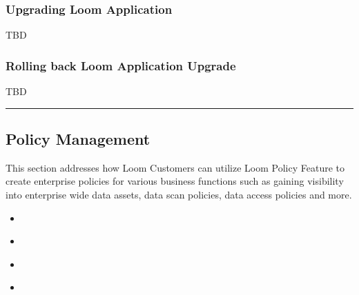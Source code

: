 \documentclass[letterpaper,10pt,english]{sphinxmanual}
\begin{document}
\subsubsection{Upgrading Loom Application}
\label{\detokenize{loom_getting_started_guide:upgrading-loom-application}}
TBD


\subsubsection{Rolling back Loom Application Upgrade}
\label{\detokenize{loom_getting_started_guide:rolling-back-loom-application-upgrade}}
TBD


\bigskip\hrule\bigskip



\subsection{Policy Management}
\label{\detokenize{loom_getting_started_guide:policy-management}}
This section addresses how Loom Customers can utilize Loom Policy Feature to create enterprise policies for various business functions such as gaining visibility into enterprise wide data assets, data scan policies, data access policies and more.

\begin{sphinxShadowBox}
\begin{itemize}
\item {} 
\label{\detokenize{loom_getting_started_guide:id112}}{\hyperref[\detokenize{loom_getting_started_guide:overview-of-loom-policies}]{}}

\item {} 
\label{\detokenize{loom_getting_started_guide:id113}}{\hyperref[\detokenize{loom_getting_started_guide:creating-a-new-loom-policy}]{}}

\item {} 
\label{\detokenize{loom_getting_started_guide:id114}}{\hyperref[\detokenize{loom_getting_started_guide:viewing-loom-policies}]{}}

\item {} 
\label{\detokenize{loom_getting_started_guide:id115}}{\hyperref[\detokenize{loom_getting_started_guide:managing-loom-policy}]{}}

\end{itemize}
\end{sphinxShadowBox}
\end{document}
